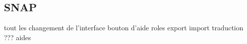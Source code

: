 \subsection{SNAP}
tout les changement de l'interface
bouton d'aide
roles
export import
traduction ???
aides